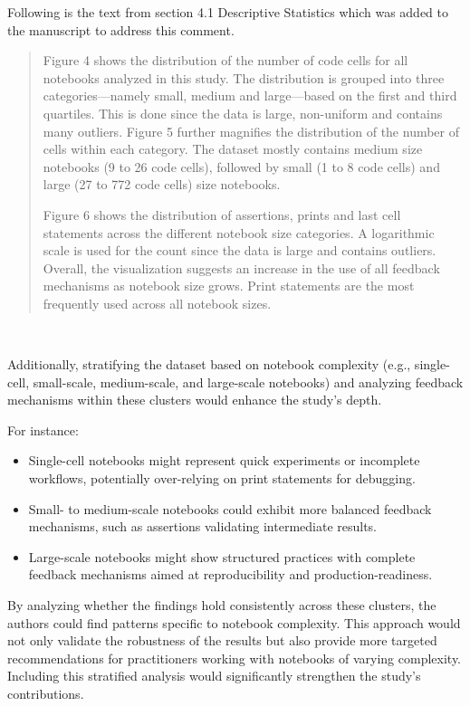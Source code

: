 \documentclass[11pt,fleqn]{article}
\newcommand{\eline}{\vspace*{.75\baselineskip}}
\newcommand{\Referee}[1]{\eline \noindent {\bf Reviewer comment #1:} \\}
\newenvironment{revcomment}[1][]
{\Referee{#1}\begin{rcomment}}
{\end{rcomment}}
\begin{document}
Following is the text from section 4.1 Descriptive Statistics which was added to the manuscript to address this comment.

\begin{quote}
  Figure 4 shows the distribution of the number of code cells for all notebooks analyzed in this study. The distribution is grouped into three categories---namely small, medium and large---based on the first and third quartiles. This is done since the data is large, non-uniform and contains many outliers. Figure 5 further magnifies the distribution of the number of cells within each category. The dataset mostly contains medium size notebooks (9 to 26 code cells), followed by small (1 to 8 code cells) and large (27 to 772 code cells) size notebooks.

  Figure 6 shows the distribution of assertions, prints and last cell statements across the different notebook size categories. A logarithmic scale is used for the count since the data is large and contains outliers. Overall, the visualization suggests an increase in the use of all feedback mechanisms as notebook size grows. Print statements are the most frequently used across all notebook sizes.
\end{quote}

\begin{revcomment}[2.4]
  Additionally, stratifying the dataset based on notebook complexity (e.g., single-cell, small-scale, medium-scale, and large-scale notebooks) and analyzing feedback mechanisms within these clusters would enhance the study's depth.

  For instance:
  \begin{itemize}
    \item Single-cell notebooks might represent quick experiments or incomplete workflows, potentially over-relying on print statements for debugging.
    \item Small- to medium-scale notebooks could exhibit more balanced feedback mechanisms, such as assertions validating intermediate results.
    \item Large-scale notebooks might show structured practices with complete feedback mechanisms aimed at reproducibility and production-readiness.
  \end{itemize}

  By analyzing whether the findings hold consistently across these clusters, the authors could find patterns specific to notebook complexity. This approach would not only validate the robustness of the results but also provide more targeted recommendations for practitioners working with notebooks of varying complexity. Including this stratified analysis would significantly strengthen the study's contributions.
\end{revcomment}
\end{document}
